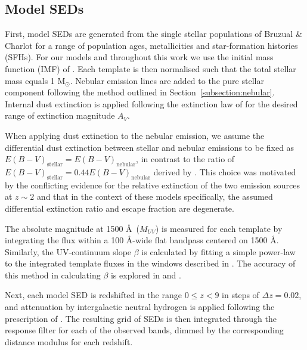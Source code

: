 
\subsection{Model SEDs}\label{subsec:seds}
First, model SEDs are generated from the single stellar populations of Bruzual \& Charlot for a range of population ages, metallicities and star-formation histories (SFHs). For our models and throughout this work we use the initial mass function (IMF) of \citet{Chabrier:2003ki}. Each template is then normalised such that the total stellar mass equals 1 M$_{\odot}$. Nebular emission lines are added to the pure stellar component following the method outlined in Section~\ref{subsection:nebular}. Internal dust extinction is applied following the extinction law of \citet{2000ApJ...533..682C} for the desired range of extinction magnitude $A_{V}$.

When applying dust extinction to the nebular emission, we assume the differential dust extinction between stellar and nebular emissions to be fixed as $E(B-V)_{\text{stellar}} = E(B-V)_{\text{nebular}}$, in contrast to the ratio of $E(B-V)_{\text{stellar}} = 0.44 E(B-V)_{\text{nebular}}$ derived by \citet{2000ApJ...533..682C}. This choice was motivated by the conflicting evidence for the relative extinction of the two emission sources at $z \sim 2$ \citep{Erb:2006ke,ForsterSchreiber:2009hm} and that in the context of these models specifically, the assumed differential extinction ratio and escape fraction are degenerate.

The absolute magnitude at 1500 \AA ~($M_{UV}$) is measured for each template by integrating the flux within a 100 \AA-wide flat bandpass centered on 1500 \AA. Similarly, the UV-continuum slope $\beta$ is calculated by fitting a simple power-law to the integrated template fluxes in the windows described in \citet{1994ApJ...429..582C}. The accuracy of this method in calculating $\beta$ is explored in \citet{Finkelstein:2012hr} and \citet{2013MNRAS.429.2456R}.

Next, each model SED is redshifted in the range $0 \le z < 9$ in steps of $\Delta z = 0.02$, and attenuation by intergalactic neutral hydrogen is applied following the prescription of \cite{1995ApJ...441...18M}. The resulting grid of SEDs is then integrated through the response filter for each of the observed bands, dimmed by the corresponding distance modulus for each redshift.

